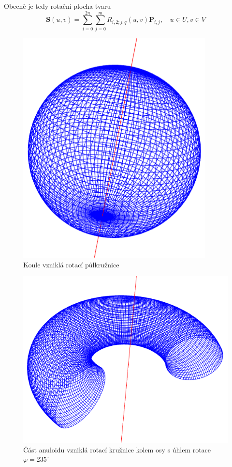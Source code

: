 Obecně je tedy rotační plocha tvaru
\begin{equation}
\mathbf{S}\left(u,v\right)=\sum_{i=0}^{2n}\sum_{j=0}^{m}R_{i,2;j,q}\left(u,v\right)\mathbf{P}_{i,j},\quad u\in U, v\in V
\end{equation}


\begin{figure}[!h]
	\begin{center}
		\includegraphics*[height=12cm]{obr/koule}
	\end{center}
	\caption{Koule vzniklá rotací půlkružnice}
	\label{obrKoule}
\end{figure}
\begin{figure}[!h]
	\begin{center}
		\includegraphics*[width=\textwidth]{obr/anuloid_cast}
	\end{center}
	\caption{Část anuloidu vzniklá rotací kružnice kolem osy s úhlem rotace $\varphi=235^\circ$}
	\label{obrAnuloid}
\end{figure}


